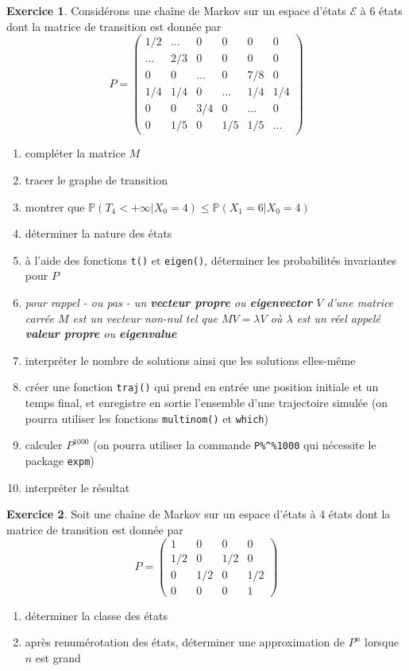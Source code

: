 \documentclass[10pt,fleqn]{article}
\theoremstyle{definition}
\newtheorem{exo}{Exercice}
\begin{document}
\begin{exo}
	Considérons une chaîne de Markov sur un espace d'états $\mathcal E$ à 6 états dont la matrice de transition est donnée par 
	$$P=
	\begin{pmatrix}
		1/2 &\dots &0 &0 &0 &0 \\
		\dots &2/3 &0 &0 &0 &0\\
		0 &0 &\dots &0 &7/8 &0\\
		1/4 &1/4 &0 &\dots &1/4 &1/4\\
		0 &0 &3/4 &0 &\dots &0\\
		0 &1/5 &0 &1/5 &1/5 &\dots
	\end{pmatrix}
	$$
	\begin{enumerate}
		\item compléter la matrice $M$
		\item tracer le graphe de transition
		\item montrer que $\mathbb P(T_4<+\infty|X_0=4)\leq \mathbb P(X_1=6|X_0=4)$
		\item déterminer la nature des états
		\item à l'aide des fonctions \verb!t()! et  \verb!eigen()!, déterminer les probabilités invariantes pour  $P$ 
		\item[]{}\emph{pour rappel - ou pas - un \textbf{vecteur propre} ou \textbf{eigenvector} $V$ d'une matrice carrée $M$ est un vecteur non-nul tel que $MV=\lambda V$ où $\lambda$ est un réel appelé \textbf{valeur propre} ou \textbf{eigenvalue}}
		\item interpréter le nombre de solutions ainsi que les solutions elles-même
		\item créer une fonction \verb!traj()! qui prend en entrée une position initiale et un temps final, et enregistre en sortie l'ensemble d'une trajectoire simulée (on pourra utiliser les fonctions \verb!multinom()! et \verb!which!)
		\item calculer $P^{1000}$ (on pourra utiliser la commande \verb!P%^%1000! qui nécessite le package \verb!expm!)
		\item interpréter le résultat
	\end{enumerate}
\end{exo}
		
\begin{exo}
	Soit une chaîne de Markov sur un espace d'états à 4 états dont la matrice de transition est donnée par
	$$
	P=
	\begin{pmatrix}
		1  &0 &0 &0 \\
		1/2 &0 &1/2 &0\\
		0 &1/2 &0 &1/2\\		
		0 &0 &0 &1
	\end{pmatrix}
	$$
	\begin{enumerate}	
		\item déterminer la classe des états
		\item après renumérotation des états, déterminer une approximation de $P^n$ lorsque $n$ est grand
	\end{enumerate}
\end{exo}
\end{document}
